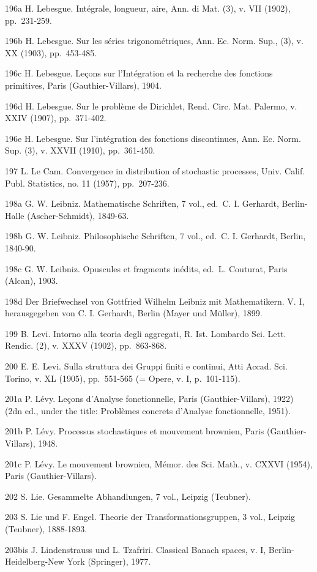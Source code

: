 196a H. Lebesgue. Intégrale, longueur, aire, Ann. di Mat. (3), v. VII (1902), pp.~231-259.

196b H. Lebesgue. Sur les séries trigonométriques, Ann. Ec. Norm. Sup., (3), v. XX (1903), pp.~453-485.

196c H. Lebesgue. Leçons sur l'Intégration et la recherche des fonctions primitives, Paris (Gauthier-Villars), 1904.

196d H. Lebesgue. Sur le problème de Dirichlet, Rend. Circ. Mat. Palermo, v. XXIV (1907), pp.~371-402.

196e H. Lebesgue. Sur l'intégration des fonctions discontinues, Ann. Ec. Norm. Sup. (3), v. XXVII (1910), pp.~361-450.

197 L. Le Cam. Convergence in distribution of stochastic processes, Univ. Calif. Publ. Statistics, no. 11 (1957), pp.~207-236.

198a G. W. Leibniz. Mathematische Schriften, 7 vol., ed.~C. I. Gerhardt, Berlin-Halle (Ascher-Schmidt), 1849-63.

198b G. W. Leibniz. Philosophische Schriften, 7 vol., ed.~C. I. Gerhardt, Berlin, 1840-90.

198c G. W. Leibniz. Opuscules et fragments inédits, ed.~L. Couturat, Paris (Alcan), 1903.

198d Der Briefwechsel von Gottfried Wilhelm Leibniz mit Mathematikern. V. I, herausgegeben von C. I. Gerhardt, Berlin (Mayer und Müller), 1899.

199 B. Levi. Intorno alla teoria degli aggregati, R. Ist. Lombardo Sci. Lett. Rendic. (2), v. XXXV (1902), pp.~863-868.

200 E. E. Levi. Sulla struttura dei Gruppi finiti e continui, Atti Accad. Sci. Torino, v. XL (1905), pp.~551-565 (= Opere, v. I, p.~101-115).

201a P. Lévy. Leçons d'Analyse fonctionnelle, Paris (Gauthier-Villars), 1922) (2dn ed., under the title: Problèmes concrets d'Analyse fonctionnelle, 1951).

201b P. Lévy. Processus stochastiques et mouvement brownien, Paris (Gauthier-Villars), 1948.

201c P. Lévy. Le mouvement brownien, Mémor. des Sci. Math., v. CXXVI (1954), Paris (Gauthier-Villars).

202 S. Lie. Gesammelte Abhandlungen, 7 vol., Leipzig (Teubner).

203 S. Lie und F. Engel. Theorie der Transformationsgruppen, 3 vol., Leipzig (Teubner), 1888-1893.

203bis J. Lindenstrauss und L. Tzafriri. Classical Banach spaces, v. I, Berlin-Heidelberg-New York (Springer), 1977.

